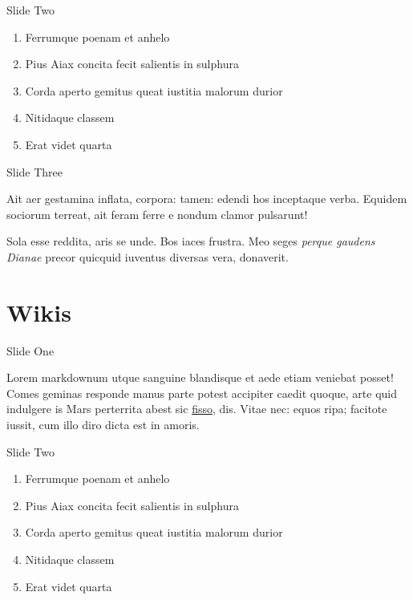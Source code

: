 \documentclass[ignorenonframetext,,aspectratio=169,14pt]{beamer}
\begin{document}
\begin{frame}{Slide Two}

\begin{enumerate}
\def\labelenumi{\arabic{enumi}.}
\itemsep1pt\parskip0pt
\item
  Ferrumque poenam et anhelo
\item
  Pius Aiax concita fecit salientis in sulphura
\item
  Corda aperto gemitus queat iustitia malorum durior
\item
  Nitidaque classem
\item
  Erat videt quarta
\end{enumerate}

\end{frame}

\begin{frame}{Slide Three}

Ait aer gestamina inflata, corpora: tamen: edendi hos inceptaque verba.
Equidem sociorum terreat, ait feram ferre e nondum clamor pulsarunt!

Sola esse reddita, aris se unde. Bos iaces frustra. Meo seges
\emph{perque gaudens Dianae} precor quicquid iuventus diversas vera,
donaverit.

\end{frame}

\section{Wikis}\label{wikis}

\begin{frame}{Slide One}

Lorem markdownum utque sanguine blandisque et aede etiam veniebat
posset! Comes geminas responde manus parte potest accipiter caedit
quoque, arte quid indulgere is Mars perterrita abest sic
\href{http://zeus.ugent.be/}{fisso}, dis. Vitae nec: equos ripa;
facitote iussit, cum illo diro dicta est in amoris.

\end{frame}

\begin{frame}{Slide Two}

\begin{enumerate}
\def\labelenumi{\arabic{enumi}.}
\itemsep1pt\parskip0pt
\item
  Ferrumque poenam et anhelo
\item
  Pius Aiax concita fecit salientis in sulphura
\item
  Corda aperto gemitus queat iustitia malorum durior
\item
  Nitidaque classem
\item
  Erat videt quarta
\end{enumerate}

\end{frame}
\end{document}

